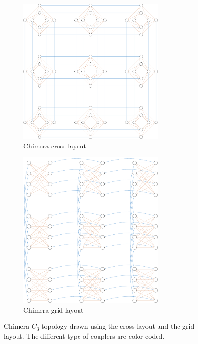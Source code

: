 \begin{figure}
    \begin{subfigure}[b]{0.5\textwidth}
        \centering
        \includegraphics[width=0.8\textwidth]{figures/chimera-cross.pdf}
        \caption{Chimera cross layout}
        \label{fig:chimera-cross}
    \end{subfigure}
    \begin{subfigure}[b]{0.45\textwidth}
        \centering
        \includegraphics[width=0.8\textwidth]{figures/chimera-shore-column.pdf}
        \caption{Chimera grid layout}
        \label{fig:chimera-shore-column}
    \end{subfigure}
    \caption{
        Chimera $C_3$ topology drawn using the cross layout and the grid layout. The different type
        of couplers are color coded.
    }
    \label{fig:chimera}
\end{figure}


